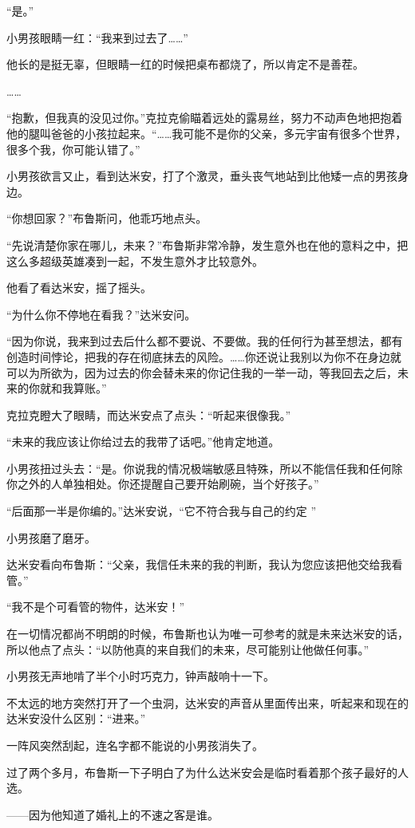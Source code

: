 \documentclass[../main]{subfiles}
\begin{document}
“是。”

小男孩眼睛一红：“我来到过去了\ldots\ldots”

他长的是挺无辜，但眼睛一红的时候把桌布都烧了，所以肯定不是善茬。

……

“抱歉，但我真的没见过你。”克拉克偷瞄着远处的露易丝，努力不动声色地把抱着他的腿叫爸爸的小孩拉起来。“……我可能不是你的父亲，多元宇宙有很多个世界，很多个我，你可能认错了。”

小男孩欲言又止，看到达米安，打了个激灵，垂头丧气地站到比他矮一点的男孩身边。

“你想回家？”布鲁斯问，他乖巧地点头。

“先说清楚你家在哪儿，未来？”布鲁斯非常冷静，发生意外也在他的意料之中，把这么多超级英雄凑到一起，不发生意外才比较意外。

他看了看达米安，摇了摇头。

“为什么你不停地在看我？”达米安问。

“因为你说，我来到过去后什么都不要说、不要做。我的任何行为甚至想法，都有创造时间悖论，把我的存在彻底抹去的风险。……你还说让我别以为你不在身边就可以为所欲为，因为过去的你会替未来的你记住我的一举一动，等我回去之后，未来的你就和我算账。”

克拉克瞪大了眼睛，而达米安点了点头：“听起来很像我。”

“未来的我应该让你给过去的我带了话吧。”他肯定地道。

小男孩扭过头去：“是。你说我的情况极端敏感且特殊，所以不能信任我和任何除你之外的人单独相处。你还提醒自己要开始刷碗，当个好孩子。”

“后面那一半是你编的。”达米安说，“它不符合我与自己的约定 ”

小男孩磨了磨牙。

达米安看向布鲁斯：“父亲，我信任未来的我的判断，我认为您应该把他交给我看管。”

“我不是个可看管的物件，达米安！”

在一切情况都尚不明朗的时候，布鲁斯也认为唯一可参考的就是未来达米安的话，所以他点了点头：“以防他真的来自我们的未来，尽可能别让他做任何事。”

小男孩无声地啃了半个小时巧克力，钟声敲响十一下。

不太远的地方突然打开了一个虫洞，达米安的声音从里面传出来，听起来和现在的达米安没什么区别：“进来。”

一阵风突然刮起，连名字都不能说的小男孩消失了。

过了两个多月，布鲁斯一下子明白了为什么达米安会是临时看着那个孩子最好的人选。

——因为他知道了婚礼上的不速之客是谁。
\end{document}
